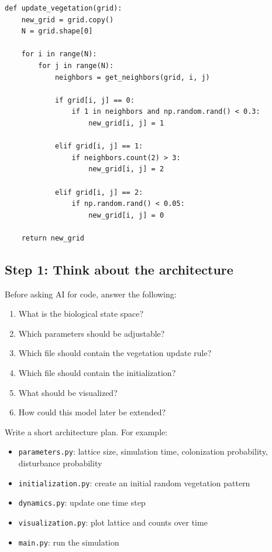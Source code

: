 \documentclass[paper=letter, fontsize=12pt]{article}
\numberwithin{equation}{section}
\begin{document}
\begin{lstlisting}
def update_vegetation(grid):
    new_grid = grid.copy()
    N = grid.shape[0]

    for i in range(N):
        for j in range(N):
            neighbors = get_neighbors(grid, i, j)

            if grid[i, j] == 0:
                if 1 in neighbors and np.random.rand() < 0.3:
                    new_grid[i, j] = 1

            elif grid[i, j] == 1:
                if neighbors.count(2) > 3:
                    new_grid[i, j] = 2

            elif grid[i, j] == 2:
                if np.random.rand() < 0.05:
                    new_grid[i, j] = 0

    return new_grid
\end{lstlisting}

\subsection*{Step 1: Think about the architecture}

\begin{taskbox}
Before asking AI for code, answer the following:
\begin{enumerate}[label=\arabic*.]
\item What is the biological state space?
\item Which parameters should be adjustable?
\item Which file should contain the vegetation update rule?
\item Which file should contain the initialization?
\item What should be visualized?
\item How could this model later be extended?
\end{enumerate}
\end{taskbox}

\begin{taskbox}
Write a short architecture plan. For example:
\begin{itemize}
\item \texttt{parameters.py}: lattice size, simulation time, colonization probability, disturbance probability
\item \texttt{initialization.py}: create an initial random vegetation pattern
\item \texttt{dynamics.py}: update one time step
\item \texttt{visualization.py}: plot lattice and counts over time
\item \texttt{main.py}: run the simulation
\end{itemize}
\end{taskbox}
\end{document}
